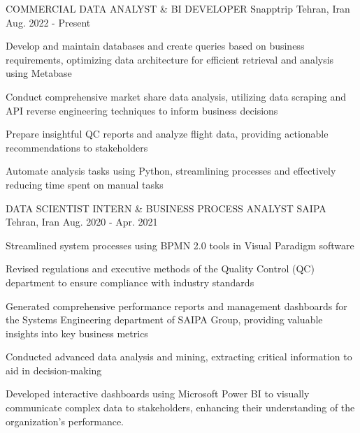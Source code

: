 

\begin{cventries}

  \cventry
    {COMMERCIAL DATA ANALYST \& BI DEVELOPER} %
    {Snapptrip} %
    {Tehran, Iran} %
    {Aug. 2022 - Present} %
    {
      \begin{cvitems} %
        \item {Develop and maintain databases and create queries based on business requirements, optimizing data architecture for efficient retrieval and analysis using Metabase}
        \item {Conduct comprehensive market share data analysis, utilizing data scraping and API reverse engineering techniques to inform business decisions}
        \item {Prepare insightful QC reports and analyze flight data, providing actionable recommendations to stakeholders}
        \item {Automate analysis tasks using Python, streamlining processes and effectively reducing time spent on manual tasks}
      \end{cvitems}
    }

  \cventry
    {DATA SCIENTIST INTERN \& BUSINESS PROCESS ANALYST} %
    {SAIPA} %
    {Tehran, Iran} %
    {Aug. 2020 - Apr. 2021} %
    {
      \begin{cvitems} %
        \item {Streamlined system processes using BPMN 2.0 tools in Visual Paradigm software}
        \item {Revised regulations and executive methods of the Quality Control (QC) department to ensure compliance with industry standards}
        \item {Generated comprehensive performance reports and management dashboards for the Systems Engineering department of SAIPA Group, providing valuable insights into key business metrics}
        \item {Conducted advanced data analysis and mining, extracting critical information to aid in decision-making}
        \item {Developed interactive dashboards using Microsoft Power BI to visually communicate complex data to stakeholders, enhancing their understanding of the organization's performance.}
      \end{cvitems}
    }

\end{cventries}
